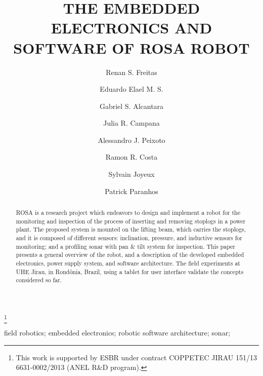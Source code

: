 \documentclass{main}
\begin{document}
\begin{frontmatter}

\title{THE EMBEDDED ELECTRONICS AND SOFTWARE OF ROSA ROBOT
} 

\thanks[footnoteinfo]{This work is supported by ESBR under contract COPPETEC
JIRAU 151/13 6631-0002/2013 (ANEL R\&D program).}

\author[1]{Renan S. Freitas}
\author[1]{Eduardo Elael M. S.}
\author[1]{Gabriel S. Alcantara}
\author[2]{Julia R. Campana}
\author[1]{Alessandro J. Peixoto}
\author[1]{Ramon R. Costa}
\author[3]{Sylvain Joyeux}
\author[3]{Patrick Paranhos}

  \address[1]{Electrical
 Engineering Department, COPPE UFRJ, Rio de Janeiro, Brazil}
  \address[2]{Professional and Technical Communication, Illinois Institute of
  Technology, Illinois, United States} 
  \address[3]{Research Department Robotics Innovation Center, German Research
 Centre for Artificial Intelligence (DFKI), Bremen, Germany}
 
\begin{abstract}                %
ROSA is a research project which endeavors to design and implement a robot for
the monitoring and inspection of the process of inserting and removing stoplogs
in a power plant. The proposed system is mounted on the lifting beam,
which carries the stoplogs, and it is composed of different sensors:
inclination, pressure, and inductive sensors for monitoring; and a profiling
sonar with pan \& tilt system for inspection. This paper presents a general
overview of the robot, and a description of the developed embedded electronics, power supply system,
and software architecture. The field experiments at UHE Jirau, in Rond{\^o}nia,
Brazil, using a tablet for user interface validate the concepts considered so far.
\end{abstract} 

\begin{keyword}
field robotics; embedded electronics; robotic software architecture; sonar;
\end{keyword}

\end{frontmatter}








  
 
\appendix
\end{document}
